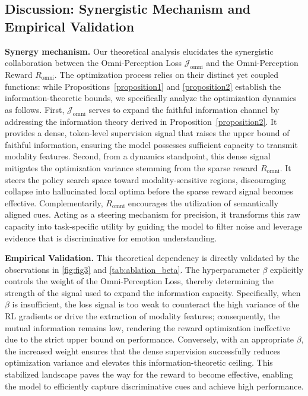 \documentclass{article}
\theoremstyle{plain}
\theoremstyle{definition}
\theoremstyle{remark}
\begin{document}
\subsection{Discussion: Synergistic Mechanism and Empirical Validation}

\noindent\textbf{Synergy mechanism.}
Our theoretical analysis elucidates the synergistic collaboration between the Omni-Perception Loss $\mathcal{J}_{\mathrm{omni}}$ and the Omni-Perception Reward $R_{\mathrm{omni}}$. The optimization process relies on their distinct yet coupled functions: while Propositions~\ref{proposition1} and \ref{proposition2} establish the information-theoretic bounds, we specifically analyze the optimization dynamics as follows. First, $\mathcal{J}_{\mathrm{omni}}$ serves to expand the faithful information channel by addressing the information theory derived in Proposition~\ref{proposition2}. It provides a dense, token-level supervision signal that raises the upper bound of faithful information, ensuring the model possesses sufficient capacity to transmit modality features. Second, from a dynamics standpoint, this dense signal mitigates the optimization variance stemming from the sparse reward $R_{\mathrm{omni}}$. It steers the policy search space toward modality-sensitive regions, discouraging collapse into hallucinated local optima before the sparse reward signal becomes effective. Complementarily, $R_{\mathrm{omni}}$ encourages the utilization of semantically aligned cues. Acting as a steering mechanism for precision, it transforms this raw capacity into task-specific utility by guiding the model to filter noise and leverage evidence that is discriminative for emotion understanding.

\noindent\textbf{Empirical Validation.}
This theoretical dependency is directly validated by the observations in \cref{fig:fig3} and \cref{tab:ablation_beta}. The hyperparameter $\beta$ explicitly controls the weight of the Omni-Perception Loss, thereby determining the strength of the signal used to expand the information capacity. Specifically, when $\beta$ is insufficient, the loss signal is too weak to counteract the high variance of the RL gradients or drive the extraction of modality features; consequently, the mutual information remains low, rendering the reward optimization ineffective due to the strict upper bound on performance. Conversely, with an appropriate $\beta$, the increased weight ensures that the dense supervision successfully reduces optimization variance and elevates this information-theoretic ceiling. This stabilized landscape paves the way for the reward to become effective, enabling the model to efficiently capture discriminative cues and achieve high performance.
\end{document}
